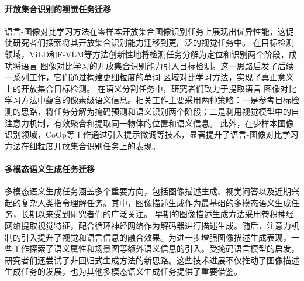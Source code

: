 \paragraph{开放集合识别的视觉任务迁移}
语言-图像对比学习方法在零样本开放集合图像识别任务上展现出优异性能，这促使研究者们探索将其开放集合识别能力迁移到更广泛的视觉任务中。
在目标检测领域，ViLD\cite{ViLD}和F-VLM\cite{F-VLM}等方法创新性地将检测任务分解为定位和识别两个阶段，成功将语言-图像对比学习的开放集合识别能力引入目标检测。这一思路启发了后续一系列工作\cite{Zhong_2022_CVPR, glip, detclip, detclip-2, detclip-3}，它们通过构建更细粒度的单词-区域对比学习方法，实现了真正意义上的开放集合目标检测。
在语义分割任务中，研究者们致力于提取语言-图像对比学习方法中蕴含的像素级语义信息。相关工作\cite{denseclip, zsseg, openseg}主要采用两种策略：一是参考目标检测的思路，将任务分解为掩码预测和语义识别两个阶段；二是利用视觉模型中的自注意力机制，有效聚合和提取同一物体的位置和语义信息。
此外，在少样本图像识别领域，CoOp等工作\cite{coop,cocoop}通过引入提示微调等技术，显著提升了语言-图像对比学习方法在细粒度开放集合识别任务上的表现。


\paragraph{多模态语义生成任务迁移}
多模态语义生成任务涵盖多个重要方向，包括图像描述生成\cite{vinyals2015show,karpathy2015deep}、视觉问答\cite{vqa}以及近期兴起的复杂人类指令理解任务\cite{llava}。其中，图像描述生成作为最基础的多模态语义生成任务，长期以来受到研究者们的广泛关注。
早期的图像描述生成方法\cite{vinyals2015show,karpathy2015deep}采用卷积神经网络提取视觉特征，配合循环神经网络作为解码器进行描述生成。随后，注意力机制的引入提升了视觉和语言信息的融合效果\cite{huang2019attention,lu2017knowing}。为进一步增强图像描述生成表现，一些工作探索了语义属性\cite{yao2017boosting}和场景图\cite{yang2019auto}等额外语义信息的引入。受掩码语言模型的启发，研究者们还尝试了非回归式生成方法\cite{gao2019masked}的新思路。这些技术进展不仅推动了图像描述生成任务的发展，也为其他多模态语义生成任务提供了重要借鉴。

